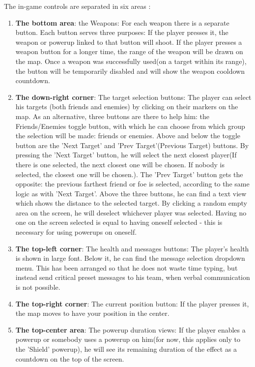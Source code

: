 \documentclass{article}
\begin{document}
The in-game controls are separated in six areas :

\begin{enumerate}
  \item \textbf{The bottom area}: the Weapons: For each weapon there is a
  separate button. Each button serves three purposes: If the player presses it,
  the weapon or powerup linked to that button will shoot. If the player presses
  a weapon button for a longer time, the range of the weapon will be drawn on
  the map. Once a weapon was successfully used(on a target within its range),
  the button will be temporarily disabled and will show the weapon cooldown
  countdown.
  
  \item \textbf{The down-right corner}: The target selection buttons: The player
  can select his targets (both friends and enemies) by clicking on their
  markers on the map. As an alternative, three buttons are there to help him:
  the Friends/Enemies toggle button, with which he can choose from which
  group the selection will be made: friends or enemies. Above and below the
  toggle button are the 'Next Target' and 'Prev Target'(Previous Target)
  buttons. By pressing the 'Next Target' button, he will select the next closest
  player(If there is one selected, the next closest one will be chosen. If
  nobody is selected, the closest one will be chosen.). The 'Prev Target' button
  gets the opposite: the previous farthest friend or foe is selected, according
  to the same logic as with 'Next Target'. Above the three buttons, he can find
  a text view which shows the distance to the selected target. By clicking a
  random empty area on the screen, he will deselect whichever player was
  selected. Having no one on the screen selected is equal to having oneself
  selected - this is necessary for using powerups on oneself.
  
  \item \textbf{The top-left corner}: The health and messages buttons: The
  player's health is shown in large font. Below it, he can find the message
  selection dropdown menu. This has been arranged so that he does not waste time
  typing, but instead send critical preset messages to his team, when verbal
  communication is not possible.
  
  \item \textbf{The top-right corner}: The current position button: If the
  player presses it, the map moves to have your position in the center.
  
  \item \textbf{The top-center area}: The powerup duration views: If the player
  enables a powerup or somebody uses a powerup on him(for now, this applies only
  to the 'Shield' powerup), he will see its remaining duration of the effect
  as a countdown on the top of the screen.
  

\end{enumerate}
\end{document}
